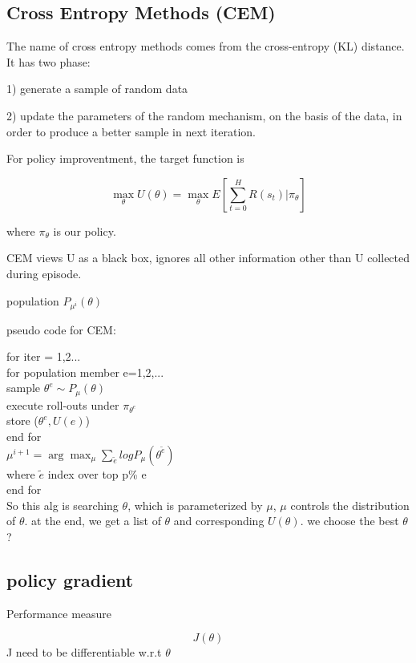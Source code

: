 \documentclass[10pt,a4paper]{book}
\begin{document}
\subsection {Cross Entropy Methods (CEM)}

The name of cross entropy methods comes from the cross-entropy (KL) distance. It has two phase:

1) generate a sample of random data

2) update the parameters of the random mechanism, on the basis of the data, in order to produce a better sample in next iteration.

For policy improventment, the target function is

$$\max_{\theta} U(\theta) = \max_{\theta}E[\sum_{t=0}^H R(s_t) | \pi_{\theta}]$$

where $\pi_{\theta}$  is our policy.

CEM views U as a black box, ignores all other information other than U collected during episode.

population $P_{\mu^i}(\theta) $

pseudo code for CEM:

\noindent \indent for iter = 1,2...\\
\indent \indent for population member e=1,2,...\\
\indent \indent \indent \indent sample $\theta^e \sim P_{\mu}(\theta)$\\
\indent \indent \indent \indent execute roll-outs under $\pi_{\theta^e}$\\
\indent \indent \indent \indent  store ($\theta^e, U(e)$)\\
\indent \indent end for\\
\indent \indent $\mu^{i+1} = \arg\max_{\mu} \sum_{\tilde{e}} log P_{\mu}(\theta^{\tilde{e}})$\\
\indent \indent where $\tilde{e}$ index over top p\% e \\
\indent end for\\

So this alg is searching $\theta$, which is parameterized by $\mu$, $\mu$ controls the distribution of $\theta$. at the end, we get a list of $\theta$ and corresponding $U(\theta)$. we choose the best $\theta$? 

\subsection {policy gradient}
Performance measure

$$J(\theta)$$
J need to be differentiable w.r.t $\theta$
\end{document}
